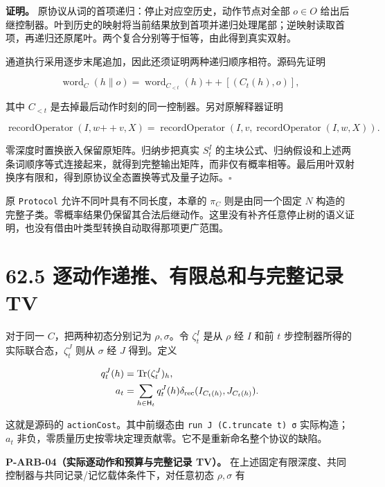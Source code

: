 \documentclass[
  11pt,
  oneside]{book}
\begin{document}
\textbf{证明。} 原协议从词的首项递归：停止对应空历史，动作节点对全部
\(o\in O\)
给出后继控制器。叶到历史的映射将当前结果放到首项并递归处理尾部；逆映射读取首项，再递归还原尾叶。两个复合分别等于恒等，由此得到真实双射。

通道执行采用逐步末尾追加，因此还须证明两种递归顺序相符。源码先证明

\[
\operatorname{word}_{C}(h\|o)
=\operatorname{word}_{C_{<t}}(h)
 \mathbin{+\!+}[(C_t(h),o)],
\]

其中 \(C_{<t}\) 是去掉最后动作时刻的同一控制器。另对原解释器证明

\[
\operatorname{recordOperator}(I,w\mathbin{+\!+}v,X)
=\operatorname{recordOperator}
  (I,v,\operatorname{recordOperator}(I,w,X)).
\]

零深度时置换嵌入保留原矩阵。归纳步把真实 \(S^I_t\)
的主块公式、归纳假设和上述两条词顺序等式连接起来，就得到完整输出矩阵，而非仅有概率相等。最后用叶双射换序有限和，得到原协议全态置换等式及量子边际。\(\square\)

原 \texttt{Protocol} 允许不同叶具有不同长度，本章的 \(\pi_C\)
则是由同一个固定 \(N\)
构造的完整子类。零概率结果仍保留其合法后继动作。这里没有补齐任意停止树的语义证明，也没有借由叶类型转换自动取得那项更广范围。

\hypertarget{ux9010ux52a8ux4f5cux9012ux63a8ux6709ux9650ux603bux548cux4e0eux5b8cux6574ux8bb0ux5f55-tv}{%
\section{62.5 逐动作递推、有限总和与完整记录
TV}\label{ux9010ux52a8ux4f5cux9012ux63a8ux6709ux9650ux603bux548cux4e0eux5b8cux6574ux8bb0ux5f55-tv}}

对于同一 \(C\)，把两种初态分别记为 \(\rho,\sigma\)。令 \(\zeta^I_t\)
是从 \(\rho\) 经 \(I\) 和前 \(t\)
步控制器所得的实际联合态，\(\zeta^J_t\) 则从 \(\sigma\) 经 \(J\)
得到。定义

\[
\begin{aligned}
q^J_t(h)&=\operatorname{Tr}(\zeta^J_t)_h,\\
a_t&=\sum_{h\in\mathsf H_t}q^J_t(h)
 \delta_{\rm rec}(I_{C_t(h)},J_{C_t(h)}).
\end{aligned}
\]

这就是源码的 \texttt{actionCost}。其中前缀态由
\texttt{run\ J\ (C.truncate\ t)\ σ} 实际构造；\(a_t\)
非负，零质量历史按零块定理贡献零。它不是重新命名整个协议的缺陷。

\protect\hypertarget{p-arb-04}{}{}

\textbf{P-ARB-04（实际逐动作和预算与完整记录 TV）。}
在上述固定有限深度、共同控制器与共同记录/记忆载体条件下，对任意初态
\(\rho,\sigma\) 有
\end{document}
